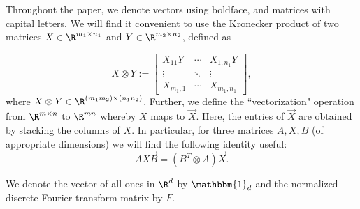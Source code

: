 Throughout the paper, we denote vectors using boldface, and matrices with capital letters.
We will find it convenient to use the Kronecker product of two matrices $X\in \R^{m_1 \times n_1}$ and $Y\in \R^{m_2 \times n_2}$, defined as 

\[X \otimes Y := \left[\begin{array}{lll} X_{11}Y & \cdots &   X_{1,n_1}Y \\ \vdots & \ddots & \vdots \\ X_{m_1,1}& \cdots & X_{m_1,n_1}\end{array}\right  ],\]
where $X \otimes Y \in \R^{(m_1 m_2) \times (n_1 n_2)}$.
Further,  we define the ``vectorization" operation from $\R^{m \times n}$ to $\R^{mn}$ whereby $X$ maps to $\vec{X}$. Here, the entries of $\vec{X}$ are obtained by stacking the columns of $X$. In particular, for three matrices $A,X,B$ (of appropriate dimensions) we will find the following identity useful: 
\[\overrightarrow{AXB} = (B^T\otimes A) \vec{X}.\]

We denote the vector of all ones in $\R^d$ by $\mathbbm{1}_d$ and the normalized discrete Fourier transform matrix by $F$.


